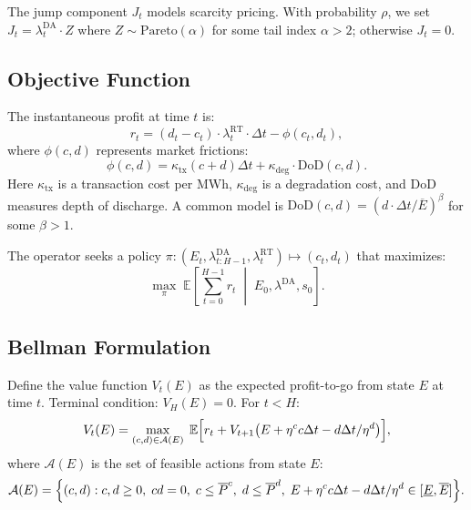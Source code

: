 \documentclass[11pt]{article}
\begin{document}
The jump component $J_t$ models scarcity pricing. With probability $\rho$, we set $J_t = \lambda^{\text{DA}}_t \cdot Z$ where $Z \sim \text{Pareto}(\alpha)$ for some tail index $\alpha > 2$; otherwise $J_t = 0$.

\subsection{Objective Function}

The instantaneous profit at time $t$ is:
\begin{equation}\label{eq:reward}
    r_t = (d_t - c_t) \cdot \lambda^{\text{RT}}_t \cdot \Delta t - \phi(c_t, d_t),
\end{equation}
where $\phi(c,d)$ represents market frictions:
\begin{equation}
    \phi(c,d) = \kappa_{\text{tx}}(c + d)\Delta t + \kappa_{\text{deg}} \cdot \text{DoD}(c,d).
\end{equation}
Here $\kappa_{\text{tx}}$ is a transaction cost per MWh, $\kappa_{\text{deg}}$ is a degradation cost, and $\text{DoD}$ measures depth of discharge. A common model is $\text{DoD}(c,d) = (d \cdot \Delta t / \overline{E})^\beta$ for some $\beta > 1$.

The operator seeks a policy $\pi: (E_t, \lambda^{\text{DA}}_{t:H-1}, \lambda^{\text{RT}}_t) \mapsto (c_t, d_t)$ that maximizes:
\begin{equation}\label{eq:objective}
    \max_\pi \; \mathbb{E}\left[\sum_{t=0}^{H-1} r_t \;\middle|\; E_0, \lambda^{\text{DA}}, s_0\right].
\end{equation}

\subsection{Bellman Formulation}

Define the value function $V_t(E)$ as the expected profit-to-go from state $E$ at time $t$. Terminal condition: $V_H(E) = 0$. For $t < H$:
\begin{equation}\label{eq:bellman}
    V_t(E) = \max_{(c,d) \in \mathcal{A}(E)} \; \mathbb{E}\Bigl[r_t + V_{t+1}\bigl(E + \eta^c c \Delta t - d\Delta t / \eta^d\bigr)\Bigr],
\end{equation}
where $\mathcal{A}(E)$ is the set of feasible actions from state $E$:
\begin{equation}
    \mathcal{A}(E) = \Bigl\{(c,d) : c,d \geq 0,\; cd = 0,\; c \leq \overline{P}^c,\; d \leq \overline{P}^d,\; E + \eta^c c \Delta t - d\Delta t/\eta^d \in [\underline{E}, \overline{E}]\Bigr\}.
\end{equation}
\end{document}
